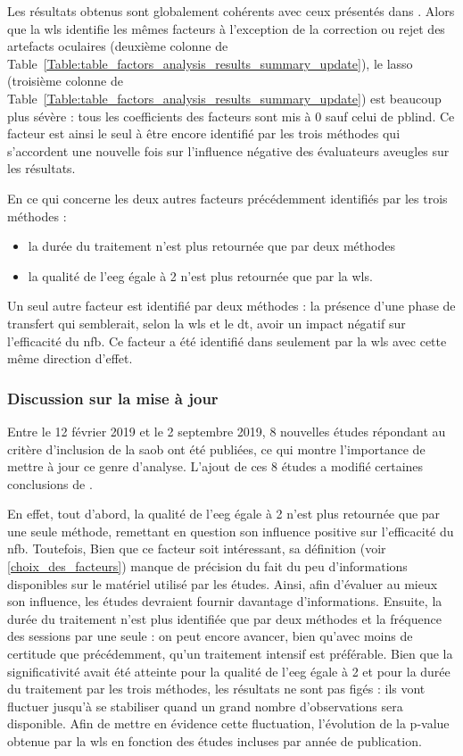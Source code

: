 Les résultats obtenus sont globalement cohérents avec ceux présentés dans \citet{Bussalb2019a}. Alors que la \gls{wls} identifie les mêmes facteurs à l'exception de la correction ou rejet 
des artefacts oculaires (deuxième colonne de Table~\ref{Table:table_factors_analysis_results_summary_update}), le \gls{lasso} (troisième colonne de 
Table~\ref{Table:table_factors_analysis_results_summary_update}) est beaucoup plus sévère : tous les coefficients des facteurs sont mis à 0 sauf celui de \gls{pblind}. Ce facteur est ainsi 
le seul à être encore identifié par les trois méthodes qui s'accordent une nouvelle fois sur l'influence négative des évaluateurs aveugles sur les résultats.  

En ce qui concerne les deux autres facteurs précédemment identifiés par les trois méthodes : 
\begin{itemize}
\item la durée du traitement n'est plus retournée que par deux méthodes 
\item la qualité de l'\gls{eeg} égale à 2 n'est plus retournée que par la \gls{wls}. 
\end{itemize}

Un seul autre facteur est identifié par deux méthodes : la présence d'une phase de transfert qui semblerait, selon la \gls{wls} et le \gls{dt}, avoir un impact négatif sur l'efficacité 
du \gls{nfb}. Ce facteur a été identifié dans \citet{Bussalb2019a} seulement par la \gls{wls} avec cette même direction d'effet.

\subsubsection{Discussion sur la mise à jour}

Entre le 12 février 2019 et le 2 septembre 2019, 8 nouvelles études répondant au critère d'inclusion de la \gls{saob} ont été publiées, ce qui montre l'importance de mettre à jour ce 
genre d'analyse. L'ajout de ces 8 études a modifié certaines conclusions de \citet{Bussalb2019a}. 

En effet, tout d'abord, la qualité de l'\gls{eeg} égale à 2 n'est plus retournée que par une seule méthode,
remettant en question son influence positive sur l'efficacité du \gls{nfb}. Toutefois, Bien que ce facteur soit intéressant, sa définition (voir \ref{choix_des_facteurs}) manque de précision 
du fait du peu d'informations disponibles sur le matériel utilisé par les études. Ainsi, afin d'évaluer au mieux son influence, les études devraient fournir davantage d'informations. Ensuite, 
la durée du traitement n'est plus identifiée que par deux méthodes et la fréquence des sessions par une seule : on peut encore avancer, bien qu'avec moins de certitude que précédemment, 
qu'un traitement intensif est préférable.  Bien que la significativité avait été atteinte pour la qualité de l'\gls{eeg} égale à 2 et pour la durée du traitement par les trois méthodes, 
les résultats ne sont pas figés : ils vont fluctuer jusqu'à se stabiliser quand un grand nombre d'observations sera disponible. Afin de mettre en évidence cette fluctuation, l'évolution 
de la p-value obtenue par la \gls{wls} en fonction des études incluses par année de publication.

